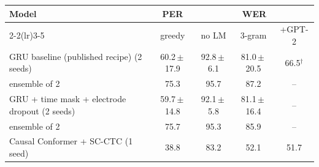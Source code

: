 \begin{tabular}{lcccc}
\toprule
Model & PER & \multicolumn{3}{c}{WER} \\ \cmidrule(lr){2-2}\cmidrule(lr){3-5}
 & greedy & no LM & 3-gram & +GPT-2 \\
\midrule
GRU baseline (published recipe) (2 seeds) & 60.2\,$\pm$\,17.9 & 92.8\,$\pm$\,6.1 & 81.0\,$\pm$\,20.5 & 66.5$^\dagger$ \\
\quad ensemble of 2 & 75.3 & 95.7 & 87.2 & -- \\
GRU + time mask + electrode dropout (2 seeds) & 59.7\,$\pm$\,14.8 & 92.1\,$\pm$\,5.8 & 81.1\,$\pm$\,16.4 & -- \\
\quad ensemble of 2 & 75.7 & 95.3 & 85.9 & -- \\
Causal Conformer + SC-CTC (1 seed) & 38.8 & 83.2 & 52.1 & 51.7 \\
\bottomrule
\end{tabular}
